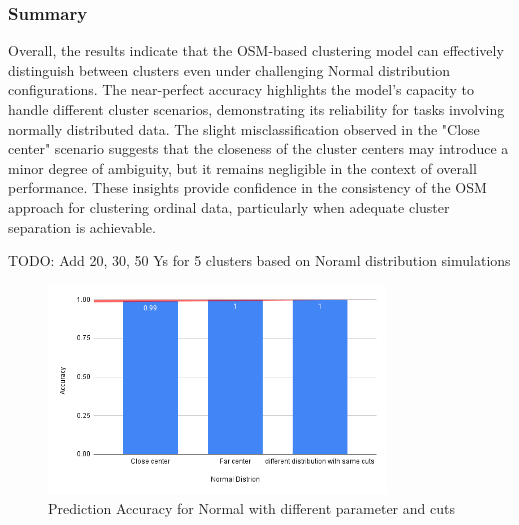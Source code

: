 \documentclass{article}
\begin{document}
\subsubsection*{Summary}

Overall, the results indicate that the OSM-based clustering model can effectively distinguish between clusters even under challenging Normal distribution configurations. 
The near-perfect accuracy highlights the model's capacity to handle different cluster scenarios, demonstrating its reliability for tasks involving normally distributed data. 
The slight misclassification observed in the "Close center" scenario suggests that the closeness of the cluster centers may introduce a minor degree of ambiguity, but it remains negligible in the context of overall performance. 
These insights provide confidence in the consistency of the OSM approach for clustering ordinal data, particularly when adequate cluster separation is achievable.

TODO: Add 20, 30, 50 Ys for 5 clusters based on Noraml distribution simulations

\begin{figure}[htbp!]
  \centering
  \includegraphics[width=0.8\textwidth]{images/experiments/norm_dist.png}
  \caption{Prediction Accuracy for Normal with different parameter and cuts}
  \label{fig:dist_acc}
\end{figure}
\end{document}
